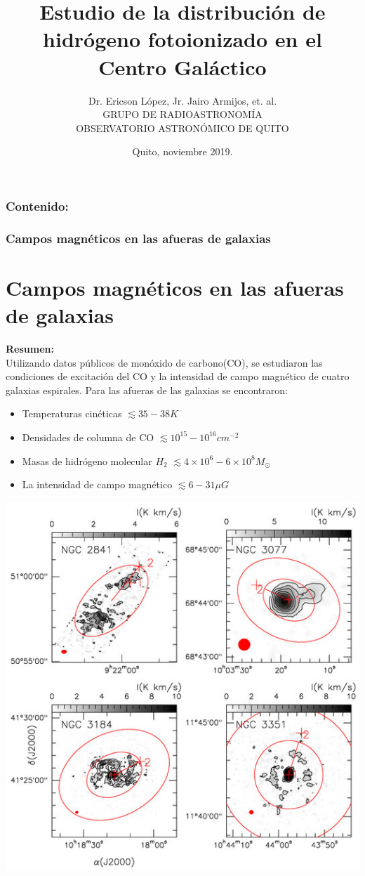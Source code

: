 \documentclass[8pt]{beamer}
\title[ Proyecto Junior PIJ-15-19]{  Estudio de la distribución de hidrógeno fotoionizado en el Centro Galáctico }
\author[Dr. Ericson López, Jr. Jairo Armijos, et. al.]{\large	 Dr. Ericson López, Jr. Jairo Armijos, et. al. \\ \vspace{0.2cm}
GRUPO DE RADIOASTRONOMÍA \\ \vspace{0.2cm} OBSERVATORIO ASTRON\'OMICO DE QUITO}
\date{Quito, noviembre 2019.}
\begin{document}
\begin{frame}

\maketitle
\end{frame}
\begin{frame}
\frametitle{Contenido:}
\tableofcontents
\end{frame}
\begin{frame}
\frametitle{Campos magnéticos en las afueras de  galaxias}
\section{Campos magnéticos en las afueras de  galaxias}
\textbf{Resumen:}\\
Utilizando datos públicos de monóxido de carbono(CO), se estudiaron las condiciones de excitación del CO y la intensidad de campo magnético de  cuatro galaxias espirales. 
Para las afueras de las galaxias se encontraron:
\begin{itemize}
\item Temperaturas cinéticas $\lesssim 35-38K$ 
\item Densidades de columna de CO $\lesssim 10^{15}-10^{16}cm^{-2}$
\item Masas de hidrógeno molecular $H_2$ $\lesssim 4\times 10^{6}-6\times 10^{8}M_{\odot} $ \item La intensidad de campo magnético  $\lesssim 6-31 \mu G$ 
\end{itemize}
\begin{center}
\includegraphics[width=0.3\linewidth]{figures/galaxies.jpg}
\end{center}
\end{frame}
\end{document}
